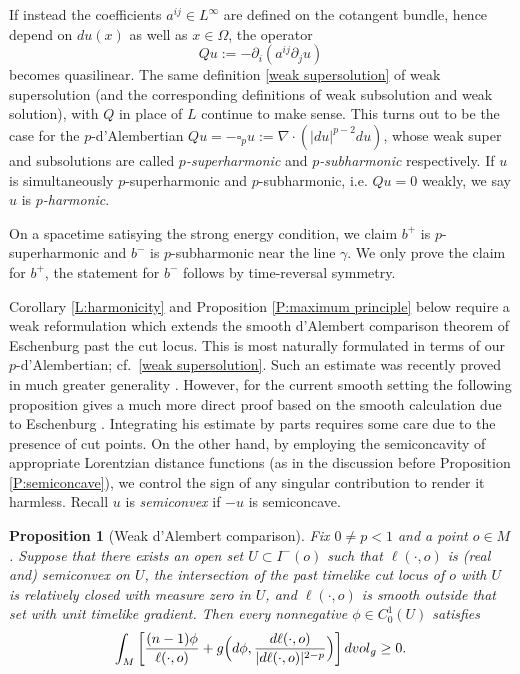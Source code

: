 \documentclass[12pt]{amsart}
\newcommand{\p}{{\partial}}
\newcommand{\vol}{{\rm vol}}
\newcommand{\vg}{\vol_g}
\newtheorem{proposition}[theorem]{Proposition}
\begin{document}
If instead the coefficients $a^{ij} %
\in L^\infty$ are defined on the cotangent bundle,  hence depend on $du(x)$ as well as $x \in \Omega$,  the operator 
\begin{equation}\label{Q}
Qu := - \p_i( a^{ij} \p_j u) %
\end{equation}
becomes quasilinear.  The same definition \eqref{weak supersolution} of weak supersolution (and the corresponding definitions of weak subsolution and weak solution),
with $Q$ in place of $L$ continue to make sense.  This {turns out to be} the case for the $p$-d'Alembertian $Qu=-\square_pu := \nabla \cdot (|du|^{p-2}du)$, whose weak super and subsolutions
are called {\em $p$-superharmonic} and {\em $p$-subharmonic} respectively.  If $u$ is {simultaneously
$p$-superharmonic and $p$-subharmonic}, i.e. $Qu=0$ weakly, we say $u$ is {\em $p$-harmonic}.


On a spacetime satisying the strong energy condition,  we claim $b^+$ is $p$-superharmonic and $b^-$ is $p$-subharmonic near the line $\gamma$. We only prove the claim for $b^+$, the statement for $b^-$ follows by 
time-reversal symmetry.

Corollary \ref{L:harmonicity} and Proposition \ref{P:maximum principle} below require a weak reformulation which extends the smooth d'Alembert comparison theorem of Eschenburg \cite{Eschenburg88} past the cut locus. 
This is most naturally formulated in terms of our $p$-d'Alembertian; cf.~\eqref{weak supersolution}. 
Such an estimate was recently proved in much greater generality \cite{BeranOctet24+}.  However, for the current smooth setting the following proposition gives a much more direct proof based on the smooth calculation due to Eschenburg \cite{Eschenburg88}.
Integrating his estimate by parts requires some care due to the presence of cut points. On the other hand, by employing the semiconcavity of appropriate Lorentzian distance functions (as in the discussion before 
Proposition \ref{P:semiconcave}), we control the sign of any singular contribution to render it harmless.  Recall $u$ is {\em semiconvex} if $-u$ is semiconcave.

\begin{proposition}[Weak d'Alembert comparison]\label{Pr:dalembert comparison} Fix $0\neq p<1$ and a point $o\in M$. Suppose that there exists an open set  $U \subset I^-(o)$ such that $\ell(\cdot,o)$ is (real and) semiconvex on $U$, the intersection of the past timelike cut locus of $o$ with $U$ is relatively closed with measure zero in $U$, and $\ell(\cdot,o)$ is smooth outside that set {with unit timelike gradient}. Then every nonnegative $\phi\in C_0^1(U)$ satisfies
\begin{align*}
\int_{M} \left[\frac{(n-1)\phi}{\ell(\cdot,o)} + g\Big(d\phi, 
\frac{d\ell(\cdot,o)}{|d\ell(\cdot,o)|^{2-p}}\Big)\right] d\vg \ge 0.
\end{align*}
\end{proposition} 
\end{document}
